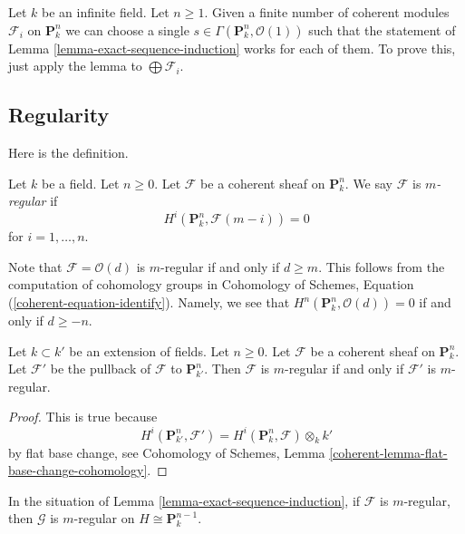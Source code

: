\begin{remark}
\label{remark-exact-sequence-induction}
Let $k$ be an infinite field. Let $n \geq 1$. Given a finite number
of coherent modules $\mathcal{F}_i$ on $\mathbf{P}^n_k$ we can choose
a single $s \in \Gamma(\mathbf{P}^n_k, \mathcal{O}(1))$ such
that the statement of Lemma \ref{lemma-exact-sequence-induction}
works for each of them.
To prove this, just apply the lemma to $\bigoplus \mathcal{F}_i$.
\end{remark}


\subsection{Regularity}
\label{subsection-regularity}

\noindent
Here is the definition.

\begin{definition}
\label{definition-regularity}
Let $k$ be a field. Let $n \geq 0$. Let $\mathcal{F}$ be a coherent
sheaf on $\mathbf{P}^n_k$. We say $\mathcal{F}$ is {\it $m$-regular}
if
$$
H^i(\mathbf{P}^n_k, \mathcal{F}(m - i)) = 0
$$
for $i = 1, \ldots, n$.
\end{definition}

\noindent
Note that $\mathcal{F} = \mathcal{O}(d)$ is $m$-regular if and only
if $d \geq m$. This follows from the computation of cohomology groups
in Cohomology of Schemes, Equation (\ref{coherent-equation-identify}).
Namely, we see that $H^n(\mathbf{P}^n_k, \mathcal{O}(d)) = 0$
if and only if $d \geq -n$.

\begin{lemma}
\label{lemma-m-regular-extend-base-field}
Let $k \subset k'$ be an extension of fields. Let $n \geq 0$.
Let $\mathcal{F}$ be a coherent sheaf on $\mathbf{P}^n_k$.
Let $\mathcal{F}'$ be the pullback of $\mathcal{F}$ to $\mathbf{P}^n_{k'}$.
Then $\mathcal{F}$ is $m$-regular if and only if $\mathcal{F}'$ is
$m$-regular.
\end{lemma}

\begin{proof}
This is true because
$$
H^i(\mathbf{P}^n_{k'}, \mathcal{F}') =
H^i(\mathbf{P}^n_k, \mathcal{F}) \otimes_k k'
$$
by flat base change, see
Cohomology of Schemes, Lemma \ref{coherent-lemma-flat-base-change-cohomology}.
\end{proof}

\begin{lemma}
\label{lemma-m-regular}
In the situation of Lemma \ref{lemma-exact-sequence-induction},
if $\mathcal{F}$ is $m$-regular, then $\mathcal{G}$ is $m$-regular
on $H \cong \mathbf{P}^{n - 1}_k$.
\end{lemma}

